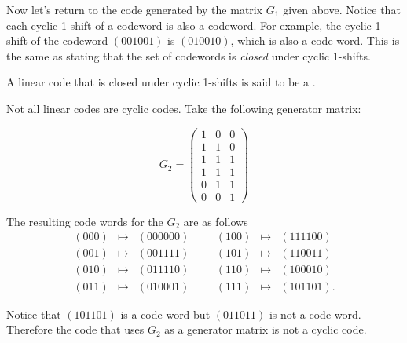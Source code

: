 Now let's return to the code generated by the matrix $G_1$ given above. Notice that each cyclic 1-shift of a codeword is also a codeword.  For example, the cyclic 1-shift of the codeword $(001001)$ is $(010010)$, which is also a code word.  This is the same as stating that the set of codewords is \emph{closed} under cyclic 1-shifts.  

\begin {defn}\label{def:cycliccode}
A linear code that is closed under cyclic 1-shifts is said to be a .  
\end {defn}

Not all linear codes are cyclic codes.  Take the following generator matrix: 

\[
G_2 = 
\begin{pmatrix}
1 & 0 & 0 \\
1 & 1 & 0 \\
1 & 1 & 1 \\
1 & 1 & 1 \\
0 & 1 & 1 \\
0 & 0 & 1
\end{pmatrix}
\]

The resulting code words for the $G_2$ are as follows\[
\begin{array}{rclccrcl}
(000) & \mapsto & (000000) & & & (100) & \mapsto & (111100) \\
(001) & \mapsto & (001111) & & & (101) & \mapsto & (110011) \\
(010) & \mapsto & (011110) & & & (110) & \mapsto & (100010) \\
(011) & \mapsto & (010001) & & & (111) & \mapsto & (101101).
\end{array}
\]

Notice that $(101101)$ is a code word but $(011011)$ is not a code word.  Therefore the code that uses $G_2$ as a generator matrix is not a cyclic code.

